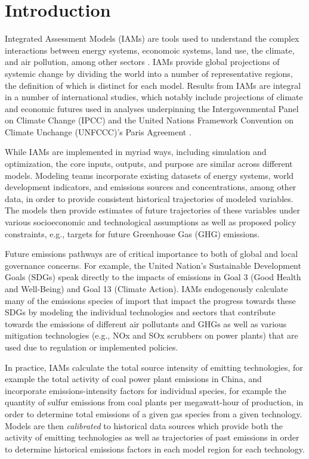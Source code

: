 \section{Introduction}

Integrated Assessment Models (IAMs) are tools used to understand the complex
interactions between energy systems, economoic systems, land use, the climate,
and air pollution, among other sectors \cite{van_vuuren_energy_2017,
  kriegler_fossil-fueled_2017, calvin_ssp4:_2017, fujimori_ssp3:_2017,
  fricko_marker_2017}. IAMs provide global projections of systemic change by
dividing the world into a number of representative regions, the definition of
which is distinct for each model. Results from IAMs are integral in a number of
international studies, which notably include projections of climate and economic
futures used in analyses underpinning the Intergovenmental Panel on Climate
Change (IPCC) and the United Nations Framework Convention on Climate Unchange
(UNFCCC)'s Paris Agreement .

While IAMs are implemented in myriad ways, including simulation and
optimization, the core inputs, outputs, and purpose are similar across different
models. Modeling teams incorporate existing datasets of energy systems, world
development indicators, and emissions sources and concentrations, among other
data, in order to provide consistent historical trajectories of modeled
variables. The models then provide estimates of future trajectories of these
variables under various socioeconomic and technological assumptions as well as
proposed policy constraints, e.g., targets for future Greenhouse Gas (GHG)
emissions.

Future emissions pathways are of critical importance to both of global and local
governance concerns. For example, the United Nation's Sustainable Development
Goals (SDGs)  speak directly to the impacts of emissions in Goal 3
(Good Health and Well-Being) and Goal 13 (Climate Action). IAMs endogenously
calculate many of the emissions species of import that impact the progress
towards these SDGs by modeling the individual technologies and sectors that
contribute towards the emissions of different air pollutants and GHGs as well as
various mitigation technologies (e.g., NOx and SOx scrubbers on power plants)
that are used due to regulation or implemented policies.

In practice, IAMs calculate the total source intensity of emitting technologies,
for example the total activity of coal power plant emissions in China, and
incorporate emissions-intensity factors for individual species, for example the
quantity of sulfur emissions from coal plants per megawatt-hour of production,
in order to determine total emissions of a given gas species from a given
technology. Models are then \textit{calibrated} to historical data sources which
provide both the activity of emitting technologies as well as trajectories of
past emissions in order to determine historical emissions factors in each model
region for each technology.

